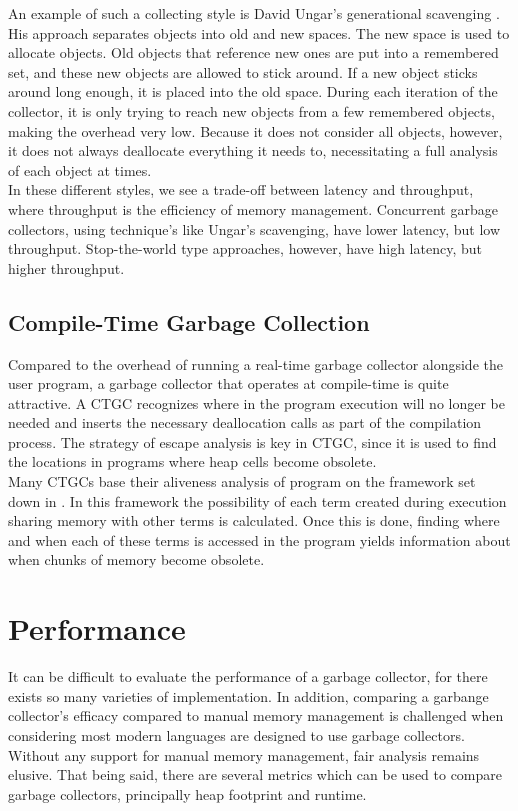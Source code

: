 \documentclass[12pt]{article}
\begin{document}
An example of such a collecting style is David Ungar's generational scavenging \cite{ungar}. His approach separates objects into old and new spaces. The new space is used to allocate objects. Old objects that reference new ones are put into a remembered set, and these new objects are allowed to stick around. If a new object sticks around long enough, it is placed into the old space. During each iteration of the collector, it is only trying to reach new objects from a few remembered objects, making the overhead very low. Because it does not consider all objects, however, it does not always deallocate everything it needs to, necessitating a full analysis of each object at times.\\

In these different styles,  we see a trade-off between latency and throughput, where throughput is the efficiency of memory management. Concurrent garbage collectors, using technique's like Ungar's scavenging, have lower latency, but low throughput. Stop-the-world type approaches, however, have high latency, but higher throughput.

\subsection{Compile-Time Garbage Collection}
Compared to the overhead of running a real-time garbage collector alongside the user program, a garbage collector that operates at compile-time is quite attractive. A CTGC recognizes where in the program execution will no longer be needed and inserts the necessary deallocation calls as part of the compilation process. The strategy of escape analysis is key in CTGC, since it is used to find the locations in programs where heap cells become obsolete.\\

Many CTGCs base their aliveness analysis of program on the framework set down in \cite{bruy}. In this framework the possibility of each term created during execution sharing memory with other terms is calculated. Once this is done, finding where and when each of these terms is accessed in the program yields information about when chunks of memory become obsolete. 


\section{Performance}

It can be difficult to evaluate the performance of a garbage collector, for there exists so many varieties of implementation. In addition, comparing a garbange collector's efficacy compared to manual memory management is challenged when considering most modern languages are designed to use garbage collectors. Without any support for manual memory management, fair analysis remains elusive. That being said, there are several metrics which can be used to compare garbage collectors, principally heap footprint and runtime.
\end{document}
